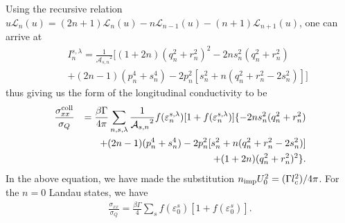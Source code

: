 \documentclass[prb,twocolumn]{revtex4-1}
\begin{document}
Using the recursive relation
$
u\mathcal{L}_n(u)=(2n+1)\mathcal{L}_n(u)-n\mathcal{L}_{n-1}(u)-(n+1)\mathcal{L}_{n+1}(u)
$, one can arrive at 
\begin{eqnarray}
&&I_n^{s,\lambda}=\frac{1}{{\mathcal{A}_{s,n}}^2}\Big[
(1+2n)(q_n^2+r_n^2)^2-2ns_n^2(q_n^2+r_n^2)\nonumber\\&&+(2n-1)(p_n^4+s_n^4)-2p_n^2[s_n^2+n(q_n^2+r_n^2-2s_n^2)]\Big]
\end{eqnarray}
thus giving us the form of the longitudinal conductivity to be
\begin{eqnarray}\label{A6}
\frac{\sigma_{xx}^{\rm coll}}{\sigma_Q}&&=\frac{\beta \Gamma}{4\pi}\sum_{n,s,\lambda}\frac{1}{{\mathcal{A}_{s,n}}^2}f(\varepsilon_n^{s,\lambda})[1+f(\varepsilon_n^{s,\lambda})]\{-2ns_n^2(q_n^2+r_n^2)\nonumber\\
&&+(2n-1)(p_n^4+s_n^4)-2p_n^2[s_n^2+n(q_n^2+r_n^2-2s_n^2)]\nonumber\\&&+(1+2n)(q_n^2+r_n^2)^2\}.
\end{eqnarray}
In the above equation, we have made the substitution $n_{\rm imp}U_0^2=(\Gamma l_c^2)/4\pi$.
For the $n=0$ Landau states, we have 
\begin{eqnarray}\label{n_0_coll}
\frac{\sigma_{xx}}{\sigma_Q}=\frac{\beta\Gamma}{4}\sum_{s}f(\varepsilon_0^s)[1+f(\varepsilon_0^s)].
\end{eqnarray}
\end{document}
